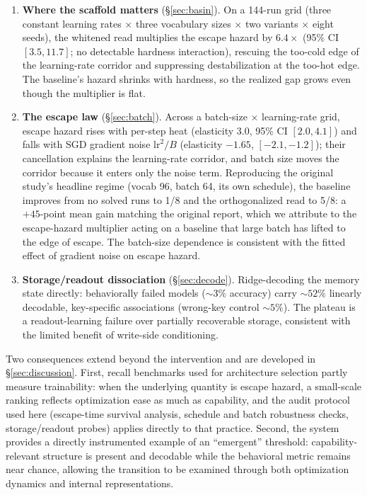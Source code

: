 \documentclass[11pt]{article}
\begin{document}
\begin{enumerate}
  Triggering the anneal after escape also preserves success for a late-escaping
  seed: 13/16 solved, matching the un-annealed combination, with
  every solver finishing at $\alpha{=}0$, mean accuracy 99.6\% on the raw read.
\item \textbf{Where the scaffold matters} (\S\ref{sec:basin}). On a 144-run grid
  (three constant learning rates $\times$ three vocabulary sizes $\times$ two
  variants $\times$ eight seeds), the whitened read multiplies the escape hazard by
  $6.4\times$ (95\% CI $[3.5, 11.7]$; no detectable hardness interaction), rescuing
  the too-cold edge of the learning-rate corridor and suppressing destabilization at the too-hot
  edge. The baseline's hazard shrinks with hardness, so the realized gap
  grows even though the multiplier is flat.
\item \textbf{The escape law} (\S\ref{sec:batch}). Across a batch-size $\times$
  learning-rate grid, escape hazard rises with per-step heat (elasticity $3.0$,
  95\% CI $[2.0, 4.1]$) and falls with SGD gradient noise $\mathrm{lr}^2/B$
  (elasticity $-1.65$, $[-2.1, -1.2]$); their cancellation explains the
  learning-rate corridor, and batch size moves the corridor because it enters
  only the noise term. Reproducing the original study's headline regime (vocab 96,
  batch 64, its own schedule), the baseline improves from no solved runs to 1/8
  and the orthogonalized read to 5/8: a $+45$-point mean gain matching the
  original report, which we attribute to the escape-hazard multiplier acting on a
  baseline that large batch has lifted to the edge of escape. The batch-size dependence
  is consistent with the fitted effect of gradient
  noise on escape hazard.
\item \textbf{Storage/readout dissociation} (\S\ref{sec:decode}). Ridge-decoding
  the memory state directly: behaviorally failed models (${\sim}3\%$ accuracy)
  carry ${\sim}52\%$ linearly decodable, key-specific associations (wrong-key
  control ${\sim}5\%$). The plateau is a readout-learning failure over
  partially recoverable storage, consistent with the limited benefit of
  write-side conditioning.
\end{enumerate}

Two consequences extend beyond the intervention and are developed in
\S\ref{sec:discussion}. First, recall benchmarks used for architecture selection
partly measure trainability: when the underlying quantity is escape hazard, a
small-scale ranking reflects optimization ease as much as capability, and the
audit protocol used here (escape-time survival analysis, schedule and batch
robustness checks, storage/readout probes) applies directly to that practice.
Second, the system provides a directly instrumented example of an ``emergent''
threshold: capability-relevant structure is present and decodable while the
behavioral metric remains near chance, allowing the transition to be examined
through both optimization dynamics and internal representations.
\end{document}
